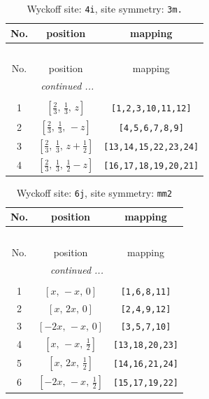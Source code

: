 \documentclass[fleqn,8pt]{jsarticle}
\begin{document}
\renewcommand{\arraystretch}{1.2}
\begin{longtable}{ccc}
\caption{Wyckoff site: {\tt 4i}, site symmetry: {\tt 3m.}}
 \\
 \hline \hline
No. & position & mapping \\ \hline \endfirsthead

\multicolumn{2}{l}{\tablename\ \thetable{}} \\
 \hline \hline
No. & position & mapping \\ \hline \endhead

 \hline \hline
\multicolumn{2}{r}{\footnotesize\it continued ...} \\ \endfoot

 \hline \hline
\multicolumn{2}{r}{} \\ \endlastfoot

1 & $\left[ \frac{2}{3},\, \frac{1}{3},\, z \right]$ & {\tt [1,2,3,10,11,12]} \\ \hline
2 & $\left[ \frac{2}{3},\, \frac{1}{3},\, - z \right]$ & {\tt [4,5,6,7,8,9]} \\ \hline
3 & $\left[ \frac{2}{3},\, \frac{1}{3},\, z + \frac{1}{2} \right]$ & {\tt [13,14,15,22,23,24]} \\ \hline
4 & $\left[ \frac{2}{3},\, \frac{1}{3},\, \frac{1}{2} - z \right]$ & {\tt [16,17,18,19,20,21]} \\
\end{longtable}
\renewcommand{\arraystretch}{1.2}
\begin{longtable}{ccc}
\caption{Wyckoff site: {\tt 6j}, site symmetry: {\tt mm2}}
 \\
 \hline \hline
No. & position & mapping \\ \hline \endfirsthead

\multicolumn{2}{l}{\tablename\ \thetable{}} \\
 \hline \hline
No. & position & mapping \\ \hline \endhead

 \hline \hline
\multicolumn{2}{r}{\footnotesize\it continued ...} \\ \endfoot

 \hline \hline
\multicolumn{2}{r}{} \\ \endlastfoot

1 & $\left[ x,\, - x,\, 0 \right]$ & {\tt [1,6,8,11]} \\ \hline
2 & $\left[ x,\, 2 x,\, 0 \right]$ & {\tt [2,4,9,12]} \\ \hline
3 & $\left[ - 2 x,\, - x,\, 0 \right]$ & {\tt [3,5,7,10]} \\ \hline
4 & $\left[ x,\, - x,\, \frac{1}{2} \right]$ & {\tt [13,18,20,23]} \\ \hline
5 & $\left[ x,\, 2 x,\, \frac{1}{2} \right]$ & {\tt [14,16,21,24]} \\ \hline
6 & $\left[ - 2 x,\, - x,\, \frac{1}{2} \right]$ & {\tt [15,17,19,22]} \\
\end{longtable}
\end{document}
